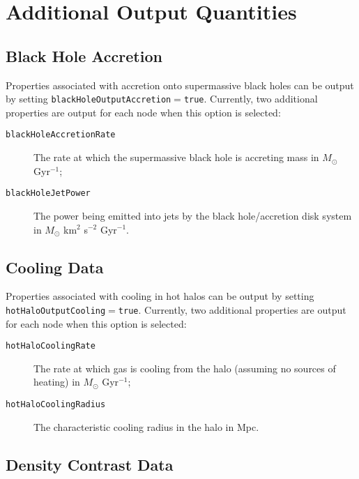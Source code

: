 \chapter{Additional Output Quantities}

\section{Black Hole Accretion}

Properties associated with accretion onto supermassive black holes can be output by setting {\tt blackHoleOutputAccretion}$=${\tt true}. Currently, two additional properties are output for each node when this option is selected:
\begin{description}
\item[{\tt blackHoleAccretionRate}] The rate at which the supermassive black hole is accreting mass in $M_\odot$ Gyr$^{-1}$;
\item[{\tt blackHoleJetPower}] The power being emitted into jets by the black hole/accretion disk system in $M_\odot$ km$^2$ s$^{-2}$ Gyr$^{-1}$.
\end{description}

\section{Cooling Data}

Properties associated with cooling in hot halos can be output by setting {\tt hotHaloOutputCooling}$=${\tt true}. Currently, two additional properties are output for each node when this option is selected:
\begin{description}
\item[{\tt hotHaloCoolingRate}] The rate at which gas is cooling from the halo (assuming no sources of heating) in $M_\odot$ Gyr$^{-1}$;
\item[{\tt hotHaloCoolingRadius}] The characteristic cooling radius in the halo in Mpc.
\end{description}

\section{Density Contrast Data}

